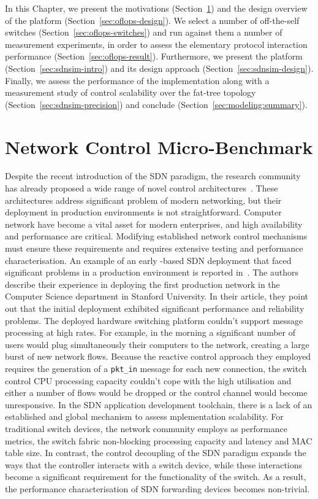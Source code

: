 In this Chapter, we present the motivations (Section~\ref{sec:oflops-intro}) and
the design overview of the \oflops platform (Section~\ref{sec:oflops-design}).
We select a number of off-the-self \of switches
(Section~\ref{sec:oflops-switches}) and run against them a number of measurement
experiments, in order to assess the elementary protocol interaction performance
(Section~\ref{sec:oflops-result}). Furthermore, we present the \sdnsim platform
(Section~\ref{sec:sdnsim-intro}) and its design approach
(Section~\ref{sec:sdnsim-design}). Finally, we assess the performance of the
\sdnsim implementation along with a measurement study of control
scalability over the fat-tree topology (Section~\ref{sec:sdnsim-precision})
and conclude (Section~\ref{sec:modeling:summary}). 


\section{Network Control Micro-Benchmark} \label{sec:oflops-intro}

Despite the recent introduction of the SDN paradigm, the research community has
already proposed a wide range of novel control architectures~\cite{plug_n_serv,
  difane,flowvisor-osdi}. These architectures address significant problem of
modern networking, but their deployment in production environments is not
straightforward.  Computer network have become a vital asset for modern
enterprises, and high availability and performance are critical. Modifying
established network control mechanisms must ensure these requirements and
requires extensive testing and performance characterisation.  An example of an
early \of-based SDN deployment that faced significant problems in a production
environment is reported in~\cite{Weissmann:va}. The authors describe their
experience in deploying the first \of production network in the Computer Science
department in Stanford University. In their article, they point out that the
initial deployment exhibited significant performance and reliability problems.
The deployed hardware switching platform couldn't support \of message processing
at high rates. For example, in the morning a significant number of users would
plug simultaneously their computers to the network, creating a large burst of
new network flows. Because the reactive control approach they employed requires
the generation of a {\tt pkt\_in} message for each new connection, the switch
control CPU processing capacity couldn't cope with the high utilisation and
either a number of flows would be dropped or the control channel would become
unresponsive. In the SDN application development toolchain, there is a lack of
an established and global mechanism to assess \of mplementation scalability.  For
traditional switch devices, the network community employs as performance
metrics, the switch fabric non-blocking processing capacity and latency and MAC
table size. In contrast, the control decoupling of the SDN paradigm expands the
ways that the controller interacts with a switch device, while these
interactions become a significant requirement for the functionality of the
switch. As a result, the performance characterisation of SDN forwarding devices
becomes non-trivial. 

